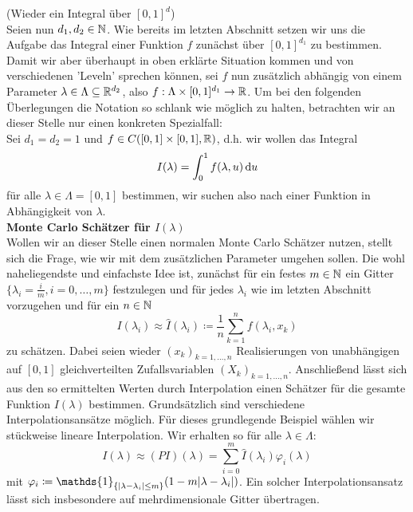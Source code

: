 \begin{Beispiel}(Wieder ein Integral über $[0,1]^d$)\\
	\label{mlmcbeispiel}
	Seien nun $ d_1,d_2  \in \mathbb{N} $.
	Wie bereits im letzten Abschnitt setzen wir uns die Aufgabe das Integral einer Funktion $ f $ zunächst über $ [0,1]^{d_1} $ zu bestimmen. Damit wir aber überhaupt in oben erklärte Situation kommen und von verschiedenen 'Leveln' sprechen können, sei $ f $ nun zusätzlich abhängig von einem Parameter $ \lambda \in \Lambda \subseteq \mathbb{R}^{d_2}$, also $f : \Lambda \times [0,1]^{d_1} \to \mathbb{R} $. Um bei den folgenden Überlegungen die Notation so schlank wie möglich zu halten, betrachten wir an dieser Stelle nur einen konkreten Spezialfall: \\
	Sei $ d_1 = d_2 = 1 $ und $ f \in C([0,1]\times[0,1],\mathbb{R}) $, d.h. wir wollen das Integral 
	\[
		I(\lambda) = \int_{0}^{1} f(\lambda,u) \, \mathrm{d} u
	\]
	für alle $ \lambda \in \Lambda = [0,1] $ bestimmen, wir suchen also nach einer Funktion in Abhängigkeit von $ \lambda $.\\
	\newline
	\textbf{Monte Carlo Schätzer für $I(\lambda)$}\\
	Wollen wir an dieser Stelle einen normalen Monte Carlo Schätzer nutzen, stellt sich die Frage, wie wir mit dem zusätzlichen Parameter umgehen sollen. Die wohl naheliegendste und einfachste Idee ist, zunächst für ein festes $ m \in \mathbb{N} $ ein Gitter $ \{ \lambda_i = \frac{i}{m}, i=0,\dots,m\} $ festzulegen und für jedes $ \lambda_i $ wie im letzten Abschnitt vorzugehen und für ein $ n \in \mathbb{N} $
	\[
		I(\lambda_i) \approx \hat{I}(\lambda_i) \coloneqq \frac{1}{n} \sum_{k=1}^{n} f(\lambda_i,x_k)
	\]
	zu schätzen. Dabei seien wieder $ (x_k)_{k=1,\dots,n} $ Realisierungen von unabhängigen auf $ [0,1] $ gleichverteilten Zufallsvariablen $ (X_k)_{k=1,\dots,n} $.
	Anschließend lässt sich aus den so ermittelten Werten durch Interpolation einen Schätzer für die gesamte Funktion $ I(\lambda) $ bestimmen. Grundsätzlich sind verschiedene Interpolationsansätze möglich. Für dieses grundlegende Beispiel wählen wir stückweise lineare Interpolation. Wir erhalten so für alle $ \lambda \in \Lambda $:
	\[
		I(\lambda) \approx (PI)(\lambda) = \sum_{i=0}^{m} \hat{I}(\lambda_i) \varphi_i(\lambda)
	\]
	mit $ \varphi_i \coloneqq \mathds{1}_{ \{\abs{\lambda - \lambda_i} \leq m \} }(1-m\abs{\lambda-\lambda_i})$. Ein solcher Interpolationsansatz lässt sich insbesondere auf mehrdimensionale Gitter übertragen.

\end{Beispiel}
